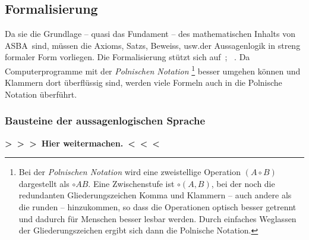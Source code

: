\documentclass[english,ngerman,parskip=half,headsepline,footsepline,
	fleqn,notitlepage]{scrreprt}
\makeatletter
\newcommand*{\todo}[1]{\textbf{>~>~>~#1~<~<~<}}%
\newcommand*{\textusw}{usw.\@ }
\newcommand*{\glsIdx}[1]{\gls{#1}\idx{\gls{#1}}}%
\newcommand*{\glsIdxPl}[1]{\glspl{#1}\idx{\gls{#1}}}%
\newcommand*{\ASBA}{\textsf{\glsIdx{ASBA}}}
\makeatother
\begin{document}
	\subsection{Formalisierung}%
	\label{sub:Formalisierung}

	Da sie die Grundlage
	-- quasi das Fundament --
	des mathematischen Inhalts von \ASBA\ sind,
	müssen die \glsIdxPl{Axiom}, \glsIdxPl{Satz}, \glsIdxPl{Beweis}, \textusw der Aussagenlogik
	in streng formaler Form vorliegen.
	Die Formalisierung stützt sich auf~\cite{bib:Aussagenlogik};
	\alsoname~\cite{bib:LogikDe, bib:LogikEn}.
	Da Computerprogramme mit der
	\emph{Polnischen Notation}%
	\footnote{%
		Bei der \emph{Polnischen Notation} wird eine zweistellige
		Operation $(A\circ B)$ dargestellt als $\circ A B$.
		Eine Zwischenstufe ist $\circ(A,B)$,
		bei der noch die redundanten Gliederungszeichen Komma und Klammern
		-- auch andere als die runden --
		hinzukommen, so dass die Operationen optisch besser getrennt
		und dadurch für Menschen besser lesbar werden.
		Durch einfaches Weglassen der Gliederungszeichen
		ergibt sich dann die Polnische Notation.%
	}
	besser umgehen können und Klammern dort überflüssig sind,
	werden viele Formeln auch in die Polnische Notation überführt.

	\subsubsection{Bausteine der aussagenlogischen Sprache}%
	\label{subsub:Bausteine}

\todo{Hier weitermachen.}%
\end{document}
